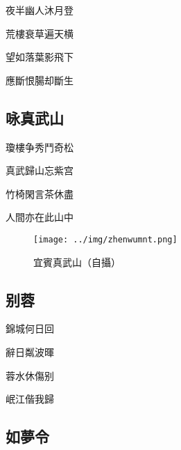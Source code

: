 \documentclass[a4j,12pt]{ltjtarticle}
\begin{document}
\begin{center}
	\vfill
		\LARGE 夜半幽人沐月登 \par
		荒樓衰草遍天横 \par
		望如落葉影飛下 \par
		應斷恨腸却斷生 
		\vspace{2cm} %
	\vfill
	
	\newpage
	
	\begin{flushleft}
		\section{咏真武山} 
	\end{flushleft}	
	
	
	\vfill
		\LARGE 瓊樓争秀鬥奇松 \par
		真武歸山忘紫宫 \par
		竹椅閑言茶休盡 \par
		人間亦在此山中 
		\vspace{1cm} %
	\vfill
	
	
	\newpage
	\vspace{3cm}
	\vfill
	\begin{figure}[h!]
		\centering
		\texttt{[image: ../img/zhenwumnt.png]}
		\caption{宜賓真武山（自攝）}
		\label{fig:zhenwu}
	\end{figure}
	\vfill
	\newpage
	
	\begin{flushleft}
		\section{别蓉} 
	\end{flushleft}	
	
	\vfill
		\LARGE 錦城何日回 \par
		辭日粼波暉 \par
		蓉水休傷别 \par
		岷江偕我歸
		\vspace{2cm} %
	\vfill
	
	\newpage
	
	\begin{flushleft}
		\section{如夢令} 
	\end{flushleft}	
	

\end{center}
\end{document}
